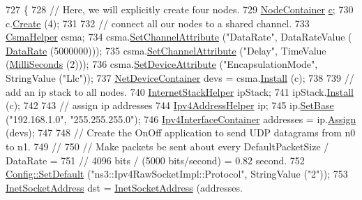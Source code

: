 \begin{DoxyCode}
727 \{
728   \textcolor{comment}{// Here, we will explicitly create four nodes.}
729   \hyperlink{classns3_1_1NodeContainer}{NodeContainer} \hyperlink{lte_2model_2fading-traces_2fading__trace__generator_8m_ae0323a9039add2978bf5b49550572c7c}{c};
730   c.\hyperlink{classns3_1_1NodeContainer_a787f059e2813e8b951cc6914d11dfe69}{Create} (4);
731 
732   \textcolor{comment}{// connect all our nodes to a shared channel.}
733   \hyperlink{classns3_1_1CsmaHelper}{CsmaHelper} csma;
734   csma.\hyperlink{classns3_1_1CsmaHelper_a886d900b2fe44433e0b81752dea7e7f1}{SetChannelAttribute} (\textcolor{stringliteral}{"DataRate"}, DataRateValue (
      \hyperlink{classns3_1_1DataRate}{DataRate} (5000000)));
735   csma.\hyperlink{classns3_1_1CsmaHelper_a886d900b2fe44433e0b81752dea7e7f1}{SetChannelAttribute} (\textcolor{stringliteral}{"Delay"}, TimeValue (\hyperlink{group__timecivil_gaf26127cf4571146b83a92ee18679c7a9}{MilliSeconds} (2)));
736   csma.\hyperlink{classns3_1_1CsmaHelper_a741c31b2526e3570cc62c9d7d9667ca9}{SetDeviceAttribute} (\textcolor{stringliteral}{"EncapsulationMode"}, StringValue (\textcolor{stringliteral}{"Llc"}));
737   \hyperlink{classns3_1_1NetDeviceContainer}{NetDeviceContainer} devs = csma.\hyperlink{classns3_1_1CsmaHelper_af79a91372595230b0817200270ab84e7}{Install} (c);
738 
739   \textcolor{comment}{// add an ip stack to all nodes.}
740   \hyperlink{classns3_1_1InternetStackHelper}{InternetStackHelper} ipStack;
741   ipStack.\hyperlink{classns3_1_1InternetStackHelper_a6645b412f31283d2d9bc3d8a95cebbc0}{Install} (c);
742 
743   \textcolor{comment}{// assign ip addresses}
744   \hyperlink{classns3_1_1Ipv4AddressHelper}{Ipv4AddressHelper} ip;
745   ip.\hyperlink{classns3_1_1Ipv4AddressHelper_acf7b16dd25bac67e00f5e25f90a9a035}{SetBase} (\textcolor{stringliteral}{"192.168.1.0"}, \textcolor{stringliteral}{"255.255.255.0"});
746   \hyperlink{classns3_1_1Ipv4InterfaceContainer}{Ipv4InterfaceContainer} addresses = ip.\hyperlink{classns3_1_1Ipv4AddressHelper_af8e7f4a1a7e74c00014a1eac445a27af}{Assign} (devs);
747 
748   \textcolor{comment}{// Create the OnOff application to send UDP datagrams from n0 to n1.}
749   \textcolor{comment}{//}
750   \textcolor{comment}{// Make packets be sent about every DefaultPacketSize / DataRate = }
751   \textcolor{comment}{// 4096 bits / (5000 bits/second) = 0.82 second.}
752   \hyperlink{group__config_ga2e7882df849d8ba4aaad31c934c40c06}{Config::SetDefault} (\textcolor{stringliteral}{"ns3::Ipv4RawSocketImpl::Protocol"}, StringValue (\textcolor{stringliteral}{"2"}));
753   \hyperlink{classns3_1_1InetSocketAddress}{InetSocketAddress} dst = \hyperlink{classns3_1_1InetSocketAddress}{InetSocketAddress} (addresses.

\end{DoxyCode}
